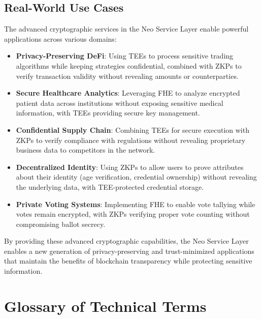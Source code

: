 \documentclass[11pt]{article}
\begin{document}
\subsection{Real-World Use Cases}

The advanced cryptographic services in the Neo Service Layer enable powerful applications across various domains:

\begin{itemize}
    \item \textbf{Privacy-Preserving DeFi}: Using TEEs to process sensitive trading algorithms while keeping strategies confidential, combined with ZKPs to verify transaction validity without revealing amounts or counterparties.
    
    \item \textbf{Secure Healthcare Analytics}: Leveraging FHE to analyze encrypted patient data across institutions without exposing sensitive medical information, with TEEs providing secure key management.
    
    \item \textbf{Confidential Supply Chain}: Combining TEEs for secure execution with ZKPs to verify compliance with regulations without revealing proprietary business data to competitors in the network.
    
    \item \textbf{Decentralized Identity}: Using ZKPs to allow users to prove attributes about their identity (age verification, credential ownership) without revealing the underlying data, with TEE-protected credential storage.
    
    \item \textbf{Private Voting Systems}: Implementing FHE to enable vote tallying while votes remain encrypted, with ZKPs verifying proper vote counting without compromising ballot secrecy.
\end{itemize}

By providing these advanced cryptographic capabilities, the Neo Service Layer enables a new generation of privacy-preserving and trust-minimized applications that maintain the benefits of blockchain transparency while protecting sensitive information.



\section{Glossary of Technical Terms}
\label{sec:glossary}
\end{document}
